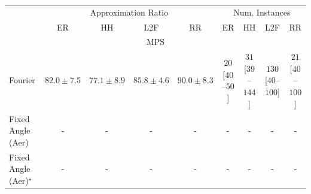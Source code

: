 \begin{tabular}{l|cccc|cccc|}
\toprule
& \multicolumn{4}{c|}{Approximation Ratio} & \multicolumn{4}{c|}{Num. Instances} \\
            & ER & HH & L2F & RR & ER & HH & L2F & RR \\
\midrule
\multicolumn{9}{c}{\rule{0pt}{8pt}MPS} \\
\midrule
Fourier & {\cellcolor[HTML]{F5841E}} \color[HTML]{F1F1F1} $82.0\pm 7.5$ & {\cellcolor[HTML]{FEB945}} \color[HTML]{000000} $77.1\pm 8.9$ & {\cellcolor[HTML]{DB5D0B}} \color[HTML]{F1F1F1} $85.8\pm 4.6$ & {\cellcolor[HTML]{AC3D03}} \color[HTML]{F1F1F1} $90.0\pm 8.3$ & {\cellcolor[HTML]{FFF3EF}} \color[HTML]{000000} $20$ [$40$--$50$] & {\cellcolor[HTML]{FEEFEB}} \color[HTML]{000000} $31$ [$39$--$144$] & {\cellcolor[HTML]{FDD3CF}} \color[HTML]{000000} $130$ [$40$--$100$] & {\cellcolor[HTML]{FFF2EE}} \color[HTML]{000000} $21$ [$40$--$100$] \\
Fixed Angle (Aer) & {\cellcolor[HTML]{000000}} \color[HTML]{F1F1F1} {\cellcolor{white}} \color{black} - & {\cellcolor[HTML]{000000}} \color[HTML]{F1F1F1} {\cellcolor{white}} \color{black} - & {\cellcolor[HTML]{000000}} \color[HTML]{F1F1F1} {\cellcolor{white}} \color{black} - & {\cellcolor[HTML]{000000}} \color[HTML]{F1F1F1} {\cellcolor{white}} \color{black} - & {\cellcolor[HTML]{000000}} \color[HTML]{F1F1F1} {\cellcolor{white}} \color{black} - & {\cellcolor[HTML]{000000}} \color[HTML]{F1F1F1} {\cellcolor{white}} \color{black} - & {\cellcolor[HTML]{000000}} \color[HTML]{F1F1F1} {\cellcolor{white}} \color{black} - & {\cellcolor[HTML]{000000}} \color[HTML]{F1F1F1} {\cellcolor{white}} \color{black} - \\
Fixed Angle (Aer)$^\star$ & {\cellcolor[HTML]{000000}} \color[HTML]{F1F1F1} {\cellcolor{white}} \color{black} - & {\cellcolor[HTML]{000000}} \color[HTML]{F1F1F1} {\cellcolor{white}} \color{black} - & {\cellcolor[HTML]{000000}} \color[HTML]{F1F1F1} {\cellcolor{white}} \color{black} - & {\cellcolor[HTML]{000000}} \color[HTML]{F1F1F1} {\cellcolor{white}} \color{black} - & {\cellcolor[HTML]{000000}} \color[HTML]{F1F1F1} {\cellcolor{white}} \color{black} - & {\cellcolor[HTML]{000000}} \color[HTML]{F1F1F1} {\cellcolor{white}} \color{black} - & {\cellcolor[HTML]{000000}} \color[HTML]{F1F1F1} {\cellcolor{white}} \color{black} - & {\cellcolor[HTML]{000000}} \color[HTML]{F1F1F1} {\cellcolor{white}} \color{black} - \\

\end{tabular}
